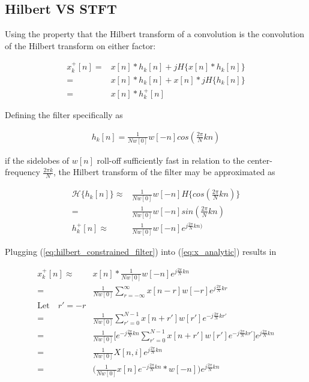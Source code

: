 \documentclass [11pt, proquest,oneside] {ganter_thesis}[2015/03/03]
\begin{document}
\subsection{Hilbert VS STFT}

Using the property that the Hilbert transform of a convolution is the convolution of the Hilbert transform on either factor:

\begin{align}
\label{eq:x_analytic}
x^+_k[n] =& x[n] * h_k[n] + jH\{x[n] * h_k[n]\} \nonumber \\
=& x[n] * h_k[n] + x[n] * jH\{h_k[n]\} \nonumber \\
=& x[n] * h^+_k[n]
\end{align}

Defining the filter specifically as

\begin{align}
h_k[n] = \frac{1}{Nw[0]}w[-n]cos(\frac{2\pi}{N}kn)
\end{align}

if the sidelobes of $w[n]$ roll-off sufficiently fast in relation to the center-frequency $\frac{2\pi k}{N}$, the Hilbert transform of the filter may be approximated as

\begin{align}
\mathcal{H}\{h_k[n]\} \approx& \frac{1}{Nw[0]}w[-n] H\{cos(\frac{2\pi}{N}kn)\} \nonumber \\
=& \frac{1}{Nw[0]}w[-n]sin(\frac{2\pi}{N}kn) \\
\label{eq:hilbert_constrained_filter}
h^+_k[n] \approx& \frac{1}{Nw[0]}w[-n]e^{j\frac{2\pi}{N}kn)}
\end{align}


Plugging (\ref{eq:hilbert_constrained_filter}) into (\ref{eq:x_analytic}) results in

\begin{align}
x^+_k[n] \approx& x[n] * \frac{1}{Nw[0]}w[-n]e^{j\frac{2\pi}{N}kn} \nonumber \\
=& \frac{1}{Nw[0]}\sum\limits_{r=-\infty}^{\infty}x[n - r] w[-r] e^{j\frac{2\pi}{N}kr} \nonumber \\
\textrm{Let} \quad r' = -r \nonumber \\
=& \frac{1}{Nw[0]}\sum\limits_{r'=0}^{N-1} x[n + r'] w[r'] e^{-j\frac{2\pi}{N}kr'} \nonumber \\
=& \frac{1}{Nw[0]}\bigg[e^{-j\frac{2\pi}{N}kn} \sum\limits_{r'=0}^{N-1} x[n + r'] w[r'] e^{-j\frac{2\pi}{N}kr'}\bigg]e^{j\frac{2\pi}{N}kn} \nonumber \\
=& \frac{1}{Nw[0]}X[n,i]e^{j\frac{2\pi}{N}kn} \nonumber \\
=& \Bigg( \frac{1}{Nw[0]}  x[n] e^{-j\frac{2\pi}{N}kn} * w[-n] \Bigg) e^{j\frac{2\pi}{N}kn}
\end{align}
\end{document}
